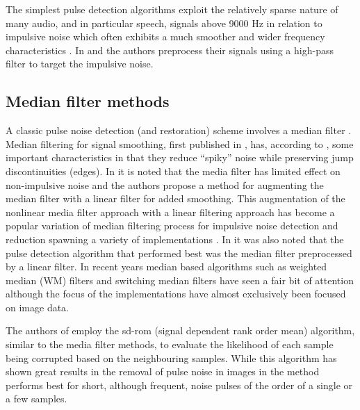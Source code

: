 The simplest pulse detection algorithms exploit the relatively sparse nature of many audio, and in particular speech, signals above 9000 Hz in relation to impulsive noise which often exhibits a much smoother and wider frequency characteristics \cite{Subramanya2007}. In \cite{Kasparis1993} and \cite{US6795559} the authors preprocess their signals using a high-pass filter to target the impulsive noise.

\subsection{Median filter methods}\label{sec:LitRevDetMedianFilts}
A classic pulse noise detection (and restoration) scheme involves a median filter \cite{Tukey1974}\linebreak[2]\cite{Lee1985}\cite{Heinonen1985}\cite{Heinonen1987}\cite{Maekivirta1991}\cite{Kasparis1993}.
Median filtering for signal smoothing, first published in \cite{Tukey1974}, has, according to \cite{Brillinger2002}, some important characteristics in that they reduce ``spiky'' noise while preserving jump discontinuities (edges). In \cite{Lee1985} it is noted that the media filter has limited effect on non-impulsive noise and the authors propose a method for augmenting the median filter with a linear filter for added smoothing. This augmentation of the nonlinear media filter approach with a linear filtering approach has become a popular variation of median filtering process for impulsive noise detection and reduction spawning a variety of implementations \cite{Lee1985}\cite{Heinonen1985}\cite{Nieminen1987}\cite{Kasparis1993}\cite{Loveridge1995}. In \cite{Kauppinen2002} it was also noted that the pulse detection algorithm that performed best was the median filter preprocessed by a linear filter. In recent years median based algorithms such as weighted median (WM) filters \cite{Yin1996}\cite{Wang2010} and switching median filters \cite{Abreu1996}\cite{Chen2000}\cite{Chen2001}\cite{Lin2007} have seen a fair bit of attention although the focus of the implementations have almost exclusively been focused on image data.

The authors of \cite{Chandra1998} employ the \gls{sd-rom} (signal dependent rank order mean) algorithm, similar to the media filter methods, to evaluate the likelihood of each sample being corrupted based on the neighbouring samples. While this algorithm has shown great results in the removal of pulse noise in images \cite{Abreu1996} in \cite{Chandra1998} the method performs best for short, although frequent, noise pulses of the order of a single or a few samples.

